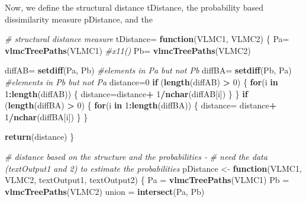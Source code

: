 \documentclass[
]{article}
\newenvironment{Shaded}{\begin{snugshade}}{\end{snugshade}}
\newcommand{\CommentTok}[1]{\textcolor[rgb]{0.56,0.35,0.01}{\textit{#1}}}
\newcommand{\ControlFlowTok}[1]{\textcolor[rgb]{0.13,0.29,0.53}{\textbf{#1}}}
\newcommand{\DecValTok}[1]{\textcolor[rgb]{0.00,0.00,0.81}{#1}}
\newcommand{\FunctionTok}[1]{\textcolor[rgb]{0.13,0.29,0.53}{\textbf{#1}}}
\newcommand{\NormalTok}[1]{#1}
\newcommand{\OtherTok}[1]{\textcolor[rgb]{0.56,0.35,0.01}{#1}}
\newcommand{\SpecialCharTok}[1]{\textcolor[rgb]{0.81,0.36,0.00}{\textbf{#1}}}
\begin{document}
Now, we define the structural distance tDistance, the probability based
dissimilarity measure pDistance, and the

\begin{Shaded}
\begin{Highlighting}[]
\CommentTok{\# structural distance measure }
\NormalTok{tDistance}\OtherTok{=} \ControlFlowTok{function}\NormalTok{(VLMC1, VLMC2)}
\NormalTok{\{}
\NormalTok{  Pa}\OtherTok{=} \FunctionTok{vlmcTreePaths}\NormalTok{(VLMC1)}
  \CommentTok{\#x11()}
\NormalTok{  Pb}\OtherTok{=} \FunctionTok{vlmcTreePaths}\NormalTok{(VLMC2)}
  
\NormalTok{  diffAB}\OtherTok{=} \FunctionTok{setdiff}\NormalTok{(Pa, Pb) }\CommentTok{\#elements in Pa but not Pb}
\NormalTok{  diffBA}\OtherTok{=} \FunctionTok{setdiff}\NormalTok{(Pb, Pa) }\CommentTok{\#elements in Pb but not Pa}
\NormalTok{  distance}\OtherTok{=}\DecValTok{0}
  \ControlFlowTok{if}\NormalTok{ (}\FunctionTok{length}\NormalTok{(diffAB) }\SpecialCharTok{\textgreater{}} \DecValTok{0}\NormalTok{)}
\NormalTok{  \{}
    \ControlFlowTok{for}\NormalTok{(i }\ControlFlowTok{in} \DecValTok{1}\SpecialCharTok{:}\FunctionTok{length}\NormalTok{(diffAB))}
\NormalTok{    \{}
\NormalTok{      distance}\OtherTok{=}\NormalTok{distance}\SpecialCharTok{+} \DecValTok{1}\SpecialCharTok{/}\FunctionTok{nchar}\NormalTok{(diffAB[i])}
\NormalTok{    \}}
\NormalTok{  \}}
  \ControlFlowTok{if}\NormalTok{ (}\FunctionTok{length}\NormalTok{(diffBA) }\SpecialCharTok{\textgreater{}} \DecValTok{0}\NormalTok{)}
\NormalTok{  \{}
    \ControlFlowTok{for}\NormalTok{(i }\ControlFlowTok{in} \DecValTok{1}\SpecialCharTok{:}\FunctionTok{length}\NormalTok{(diffBA))}
\NormalTok{    \{}
\NormalTok{      distance}\OtherTok{=}\NormalTok{ distance}\SpecialCharTok{+} \DecValTok{1}\SpecialCharTok{/}\FunctionTok{nchar}\NormalTok{(diffBA[i])}
\NormalTok{    \}}
\NormalTok{  \}}
  
  \FunctionTok{return}\NormalTok{(distance)}
\NormalTok{\}}

\CommentTok{\# distance based on the structure and the probabilities {-} }
\CommentTok{\# need the data (textOutput1 and 2) to estimate the probabilities }
\NormalTok{pDistance }\OtherTok{\textless{}{-}} \ControlFlowTok{function}\NormalTok{(VLMC1, VLMC2, textOutput1, textOutput2)}
\NormalTok{\{}
\NormalTok{  Pa }\OtherTok{=} \FunctionTok{vlmcTreePaths}\NormalTok{(VLMC1)}
\NormalTok{  Pb }\OtherTok{=} \FunctionTok{vlmcTreePaths}\NormalTok{(VLMC2) }
\NormalTok{  union }\OtherTok{=} \FunctionTok{intersect}\NormalTok{(Pa, Pb)}
  

\end{Highlighting}
\end{Shaded}
\end{document}
